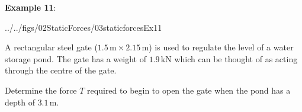 \documentclass[10pt,onesided]{amsart}
\begin{document}
\begin{minipage}[t]{0.4\textwidth}
	\textbf{Example 11}:\\
	\begin{cfig}[0.5]{../../figs/02StaticForces/03staticforcesEx11}\end{cfig}
	\raggedright
	A rectangular steel gate ($1.5\,\text{m}\times2.15\,\text{m}$) is used to regulate the level of a water storage pond.
	The gate has a weight of $1.9\,\text{kN}$ which can be thought of as acting through the centre of the gate.\par \bigskip
	Determine the force $T$ required to begin to open the gate when the pond has a depth of $3.1\,\text{m}$.
\end{minipage}
%
\end{document}
